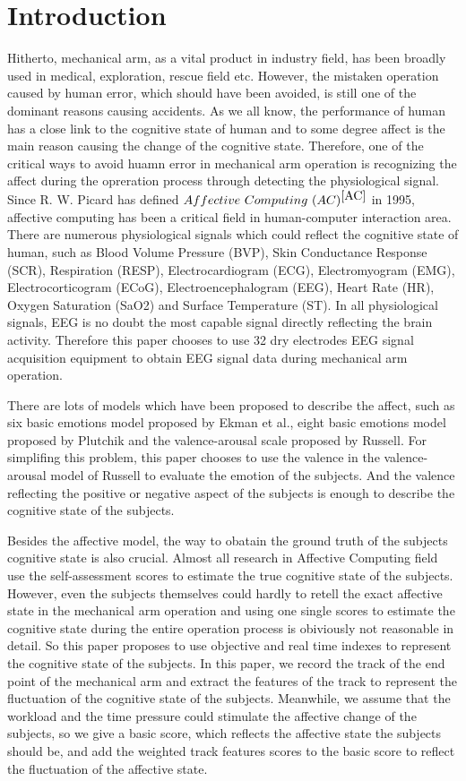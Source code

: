 \documentclass[runningheads,a4paper]{llncs}
\begin{document}
\section{Introduction}
Hitherto, mechanical arm, as a vital product in industry field, has been broadly
used in medical, exploration, rescue field etc. However, the mistaken operation
caused by human error, which should have been avoided, is still one of the
dominant reasons causing accidents. As we all know, the performance of human has a
close link to the cognitive state of human and to some degree affect is the
main reason causing the change of the cognitive state. Therefore, one of the
critical ways to avoid huamn error in mechanical arm operation is recognizing
the affect during the opreration process through detecting the physiological
signal. Since R. W. Picard has defined $Affective\ Computing\ (AC)^{\cite{AC}}$
in 1995, affective computing has been a critical field in human-computer
interaction area. There are numerous physiological signals which could reflect
the cognitive state of human, such as Blood Volume Pressure (BVP), Skin Conductance
Response (SCR), Respiration (RESP), Electrocardiogram (ECG), Electromyogram (EMG),
Electrocorticogram (ECoG), Electroencephalogram (EEG), Heart Rate (HR), Oxygen
Saturation (SaO2) and Surface Temperature (ST)\cite{KR}. In all physiological
signals, EEG is no doubt the most capable signal directly reflecting the brain
activity. Therefore this paper chooses to use 32 dry electrodes EEG signal acquisition
equipment to obtain EEG signal data during mechanical arm operation.


There are lots of models which have been proposed to describe the affect, such as
six basic emotions model proposed by Ekman et al.\cite{Ekman}, eight basic emotions
model proposed by Plutchik\cite{Plutchik} and the valence-arousal scale proposed
by Russell\cite{Russell}. For simplifing this problem, this paper chooses to use the
valence in the valence-arousal model of Russell to evaluate the emotion of the subjects.
And the valence reflecting the positive or negative aspect of the subjects is enough
to describe the cognitive state of the subjects.


Besides the affective model, the way to obatain the ground truth of the subjects cognitive state
is also crucial. Almost all research in Affective Computing field use the self-assessment
scores to estimate the true cognitive state of the subjects. However, even the subjects
themselves could hardly to retell the exact affective state in the mechanical arm operation
and using one single scores to estimate the cognitive state during the entire operation process
is obiviously not reasonable in detail. So this paper proposes to use objective and real time
indexes to represent the cognitive state of the subjects. In this paper, we record the track
of the end point of the mechanical arm and extract the features of the track to represent
the fluctuation of the cognitive state of the subjects. Meanwhile, we assume that the workload
and the time pressure could stimulate the affective change of the subjects, so we give a
basic score, which reflects the affective state the subjects should be, and add the weighted
track features scores to the basic score to reflect the fluctuation of the affective state.
\end{document}
